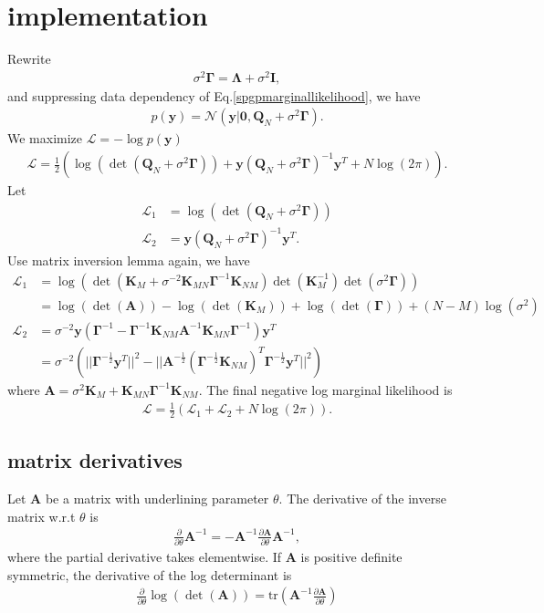 \documentclass[10pt,a4paper]{article}
\begin{document}
\section{implementation}
Rewrite
\begin{align}
\sigma^2\pmb{\Gamma}=\pmb{\Lambda}+\sigma^2\pmb{I},
\end{align}
and suppressing data dependency of Eq.\ref{spgpmarginallikelihood}, we have
\begin{align}
p(\pmb{y})=\mathcal{N}(\pmb{y}|\pmb{0},\pmb{Q}_N+\sigma^2\pmb{\Gamma}).
\end{align}
We maximize $\mathcal{L}=-\log p(\pmb{y})$
\begin{align}
\mathcal{L}=\frac{1}{2}(\log(\det(\pmb{Q}_N+\sigma^2\pmb{\Gamma}))+\pmb{y}(\pmb{Q}_N+\sigma^2\pmb{\Gamma})^{-1}\pmb{y}^T +N\log(2\pi)).
\end{align}
Let
\begin{align}
\mathcal{L}_1&=\log(\det(\pmb{Q}_N+\sigma^2\pmb{\Gamma}))\\
\mathcal{L}_2&=\pmb{y}(\pmb{Q}_N+\sigma^2\pmb{\Gamma})^{-1}\pmb{y}^T.
\end{align}
Use matrix inversion lemma again, we have
\begin{align}
\mathcal{L}_1&=\log(\det(\pmb{K}_M+\sigma^{-2}\pmb{K}_{MN}\pmb{\Gamma}^{-1}\pmb{K}_{NM})\det(\pmb{K}_M^{-1})\det(\sigma^2\pmb{\Gamma}))\nonumber\\
&=\log(\det(\pmb{A}))-\log(\det(\pmb{K}_M))+\log(\det(\pmb{\Gamma}))+(N-M)\log(\sigma^2)\\
\mathcal{L}_2&=\sigma^{-2}\pmb{y}(\pmb{\Gamma}^{-1}-\pmb{\Gamma}^{-1}\pmb{K}_{NM}\pmb{A}^{-1}\pmb{K}_{MN}\pmb{\Gamma}^{-1})\pmb{y}^T\\
&=\sigma^{-2}(||\pmb{\Gamma}^{-\frac{1}{2}}\pmb{y}^T||^2-||\pmb{A}^{-\frac{1}{2}}(\pmb{\Gamma}^{-\frac{1}{2}}\pmb{K}_{NM})^T\pmb{\Gamma}^{-\frac{1}{2}}\pmb{y}^T||^2)
\end{align}
where $\pmb{A}=\sigma^2\pmb{K}_M+\pmb{K}_{MN}\pmb{\Gamma}^{-1}\pmb{K}_{NM}$. The final negative log marginal likelihood is 
\begin{align}
\mathcal{L}=\frac{1}{2}(\mathcal{L}_1+\mathcal{L}_2+N\log(2\pi)).
\end{align}
\subsection{matrix derivatives}
Let $\pmb{A}$ be a matrix with underlining parameter $\theta$. The derivative of the inverse matrix w.r.t $\theta$ is
\begin{align}
\frac{\partial}{\partial\theta}\pmb{A}^{-1}=-\pmb{A}^{-1}\frac{\partial\pmb{A}}{\partial\theta}\pmb{A}^{-1},
\end{align}
where the partial derivative takes elementwise. If $\pmb{A}$ is positive definite symmetric, the derivative of the log determinant is
\begin{align}
\frac{\partial}{\partial\theta}\log(\det(\pmb{A}))=\mathrm{tr}(\pmb{A}^{-1}\frac{\partial\pmb{A}}{\partial\theta})
\end{align}
\end{document}
